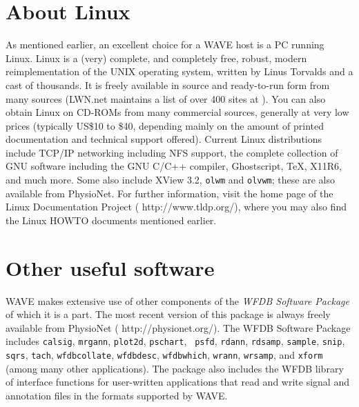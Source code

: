 \documentclass[twoside]{book}
\newcommand{\WAVE}{{\sf WAVE}\xspace}
\begin{document}
\section{About Linux}
\label{sec:linux}
As mentioned earlier, an excellent choice for a \WAVE{}
host is a PC running Linux.  Linux is a (very) complete, and
completely free, robust, modern reimplementation of the UNIX operating
system, written by Linus Torvalds and a cast of thousands.  It is
freely available in source and ready-to-run form from many
sources (LWN.net maintains a list of over 400 sites at
).
You can also obtain Linux on CD-ROMs from many
commercial sources, generally at very low prices (typically US\$10 to
\$40, depending mainly on the amount of printed documentation and
technical support offered).  Current Linux distributions include
TCP/IP networking including NFS
support, the complete collection of GNU software including the GNU
C/C++ compiler, Ghostscript, \TeX, X11R6, and much more.  Some also include
XView 3.2, {\tt olwm} and {\tt olvwm};  these are also available
from PhysioNet.  For further
information, visit the home page of the Linux Documentation Project
(
{http://www.tldp.org/}), where you may also find the Linux HOWTO
documents mentioned earlier.

\section{Other useful software}
\label{sec:other-software}

\WAVE{} makes extensive use of other components of the \emph{WFDB
Software Package} of which it is a part.  The most recent version of
this package is always freely available from PhysioNet
(
{http://physionet.org/}).  The WFDB Software Package includes
{\tt calsig}, {\tt mrgann}, {\tt plot2d}, {\tt pschart}, {\tt
psfd}, {\tt rdann}, {\tt rdsamp}, {\tt sample}, {\tt snip}, {\tt
sqrs}, {\tt tach}, {\tt wfdbcollate}, {\tt wfdbdesc}, {\tt wfdbwhich},
{\tt wrann}, {\tt wrsamp}, and {\tt xform} (among many other applications).
The package also includes the WFDB library of interface functions for
user-written applications that read and write signal and annotation
files in the formats supported by \WAVE{}.
\end{document}
